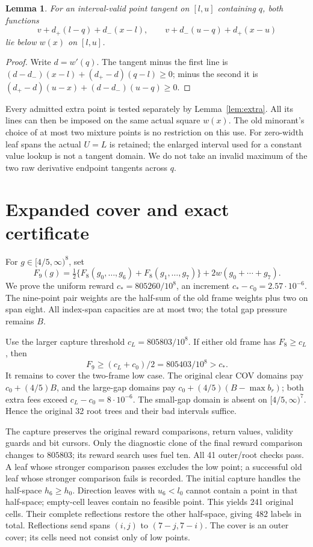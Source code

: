 \documentclass[11pt,a4paper]{article}
\newtheorem{lemma}[theorem]{Lemma}
\begin{document}
\begin{lemma}\label{lem:anchor}
For an interval-valid point tangent on $[l,u]$ containing $q$,
both functions
\[
 v+d_+(l-q)+d_-(x-l),\qquad
 v+d_-(u-q)+d_+(x-u)
\]
lie below $w(x)$ on $[l,u]$.
\end{lemma}
\begin{proof}
Write $d=w'(q)$. The tangent minus the first line is
$(d-d_-)(x-l)+(d_+-d)(q-l)\ge0$; minus the second it is
$(d_+-d)(u-x)+(d-d_-)(u-q)\ge0$.
\end{proof}

Every admitted extra point is tested separately by Lemma~\ref{lem:extra}.
All its lines can then be imposed on the same actual square $w(x)$.
The old minorant's choice of at most two mixture points is no restriction
on this use. For zero-width leaf spans the actual $U=L$ is retained;
the enlarged interval used for a constant value lookup is not a tangent
domain. We do not take an invalid maximum of the two raw derivative
endpoint tangents across $q$.

\section{Expanded cover and exact certificate}\label{sec:finite}

For $g\in[4/5,\infty)^8$, set
\[
 F_9(g)=\tfrac12\{F_8(g_0,\ldots,g_6)+F_8(g_1,\ldots,g_7)\}
           +2w(g_0+\cdots+g_7).
\]
We prove the uniform reward $c_*=805260/10^8$, an increment
$c_*-c_0=2.57\cdot10^{-6}$. The nine-point pair weights are the
half-sum of the old frame weights plus two on span eight. All index-span
capacities are at most two; the total gap pressure remains $B$.

Use the larger capture threshold $c_L=805803/10^8$.
If either old frame has $F_8\ge c_L$, then
\[
 F_9\ge(c_L+c_0)/2=805403/10^8>c_*.
\]
It remains to cover the two-frame low case. The original clear COV
domains pay $c_0+(4/5)B$, and the large-gap domains pay
$c_0+(4/5)(B-\max b_r)$; both extra fees exceed
$c_L-c_0=8\cdot10^{-6}$. The small-gap domain is absent on
$[4/5,\infty)^7$. Hence the original 32 root trees and their bad
intervals suffice.

The capture preserves the original reward comparisons, return values,
validity guards and bit cursors. Only the diagnostic clone of the final
reward comparison changes to $805803$; its reward search uses fuel ten.
All 41 outer/root checks pass. A leaf whose stronger comparison passes
excludes the low point; a successful old leaf whose stronger comparison
fails is recorded. The initial capture handles the half-space $h_6\ge h_0$.
Direction leaves with $u_6<l_0$ cannot contain a point in that half-space;
empty-cell leaves contain no feasible point. This yields 241 original
cells. Their complete reflections restore the other half-space, giving
482 labels in total. Reflections send spans $(i,j)$ to $(7-j,7-i)$.
The cover is an outer cover; its cells need not consist only of low points.
\end{document}
